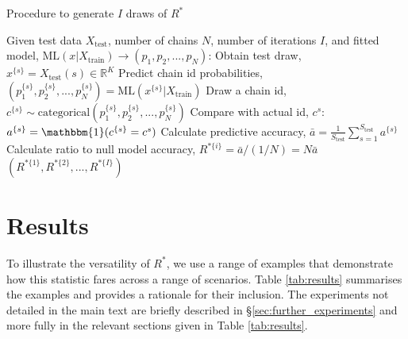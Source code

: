 \documentclass{article}
\begin{document}
\begin{algorithm}[tb]
	\caption{Procedure to generate $I$ draws of $R^*$}
	\label{alg:R_star_uncertainty}
	\begin{algorithmic}
		\STATE Given test data $X_\text{test}$, number of chains $N$, number of iterations $I$, and fitted
		\STATE model, $\text{ML}(x|X_\text{train})\rightarrow(p_1,p_2,...,p_N)$:
		\STATE Obtain test draw, $x^{\{s\}}=X_\text{test}(s)\in \mathbb{R}^K$
		\STATE Predict chain id probabilities, $(p_1^{\{s\}},p_2^{\{s\}},...,p_N^{\{s\}})= \text{ML}(x^{\{s\}}|X_\text{train})$
		\STATE Draw a chain id, $c^{\{s\}} \sim \text{categorical}(p_1^{\{s\}},p_2^{\{s\}},...,p_N^{\{s\}})$
		\STATE Compare with actual id, $c^s$: $a^{\{s\}}=\mathbbm{1}(c^{\{s\}}=c^s)$
		\ENDFOR
		\STATE Calculate predictive accuracy, $\bar{a} = \frac{1}{S_\text{test}} \sum_{s=1}^{S_\text{test}} a^{\{s\}}$
		\STATE Calculate ratio to null model accuracy, $R^{*\{i\}} = \bar{a} / (1 / N) = N\bar{a}$
		\ENDFOR
		\RETURN $(R^{*\{1\}},R^{*\{2\}},...,R^{*\{I\}})$
	\end{algorithmic}
\end{algorithm}

\section{Results}\label{sec:results}
To illustrate the versatility of $R^*$, we use a range of examples that demonstrate how this statistic fares across a range of scenarios. Table \ref{tab:results} summarises the examples and provides a rationale for their inclusion. The experiments not detailed in the main text are briefly described in \S\ref{sec:further_experiments} and more fully in the relevant sections given in Table \ref{tab:results}.
\end{document}
